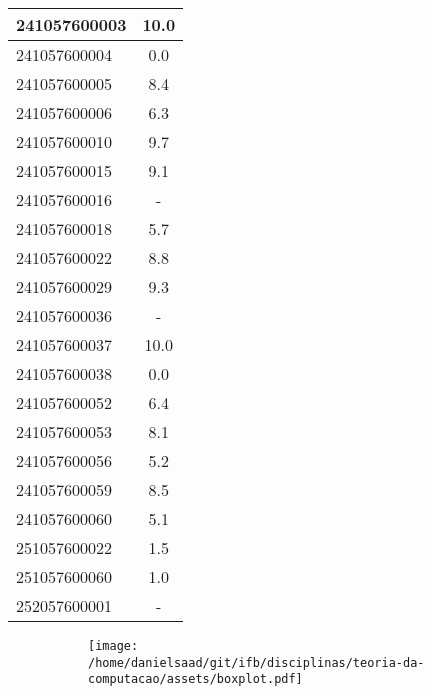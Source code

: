\documentclass{article}
\begin{document}
\begin{longtable}{|l|c|}
241057600003 & 10.0\\\hline
241057600004 & 0.0\\\hline
241057600005 & 8.4\\\hline
241057600006 & 6.3\\\hline
241057600010 & 9.7\\\hline
241057600015 & 9.1\\\hline
241057600016 & -\\\hline
241057600018 & 5.7\\\hline
241057600022 & 8.8\\\hline
241057600029 & 9.3\\\hline
241057600036 & -\\\hline
241057600037 & 10.0\\\hline
241057600038 & 0.0\\\hline
241057600052 & 6.4\\\hline
241057600053 & 8.1\\\hline
241057600056 & 5.2\\\hline
241057600059 & 8.5\\\hline
241057600060 & 5.1\\\hline
251057600022 & 1.5\\\hline
251057600060 & 1.0\\\hline
252057600001 & -\\\hline
\end{longtable}
\begin{figure}[h!]
\centering\begin{subfigure}
        \centering
        \texttt{[image: /home/danielsaad/git/ifb/disciplinas/teoria-da-computacao/assets/boxplot.pdf]}
    \end{subfigure}\end{figure}
\end{document}
